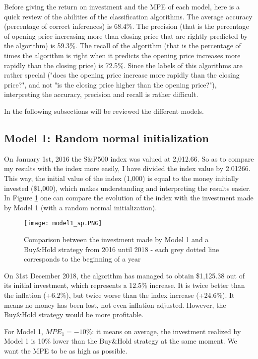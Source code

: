 \documentclass[11pt]{article}
\begin{document}
\begin{onehalfspace}
Before giving the return on investment and the MPE of each model, here is a quick review of the abilities of the classification algorithms. The average accuracy (percentage of correct inferences) is 68.4\%. The precision (that is the percentage of opening price increasing more than closing price that are rightly predicted by the algorithm) is 59.3\%. The recall of the algorithm (that is the percentage of times the algorithm is right when it predicts the opening price increases more rapidly than the closing price) is 72.5\%. Since the labels of this algorithms are rather special ("does the opening price increase more rapidly than the closing price?", and not "is the closing price higher than the opening price?"), interpreting the accuracy, precision and recall is rather difficult.


In the following subsections will be reviewed the different models.

\subsection{Model 1: Random normal initialization}

On January 1st, 2016 the S\&P500 index was valued at 2,012.66. So as to compare my results with the index more easily, I have divided the index value by 2.01266. This way, the initial value of the index (1,000) is equal to the money initially invested (\$1,000), which makes understanding and interpreting the results easier. In Figure \ref{fig:plot_model1} one can compare the evolution of the index with the investment made by Model 1 (with a random normal initialization).

\begin{figure}[h!]
     \centering
     \texttt{[image: model1\_sp.PNG]}
     \caption{Comparison between the investment made by Model 1 and a Buy\&Hold strategy from 2016 until 2018 - each grey dotted line corresponds to the beginning of a year}
\label{fig:plot_model1}
\end{figure}

On 31st December 2018, the algorithm has managed to obtain \$1,125.38 out of its initial investment, which represents a 12.5\% increase. It is twice better than the inflation (+6.2\%), but twice worse than the index increase (+24.6\%). It means no money has been lost, not even inflation adjusted. However, the Buy\&Hold strategy would be more profitable. 

For Model 1, $MPE_1 = -10\%$: it means on average, the investment realized by Model 1 is 10\% lower than the Buy\&Hold strategy at the same moment. We want the MPE to be as high as possible.


\end{onehalfspace}
\end{document}
